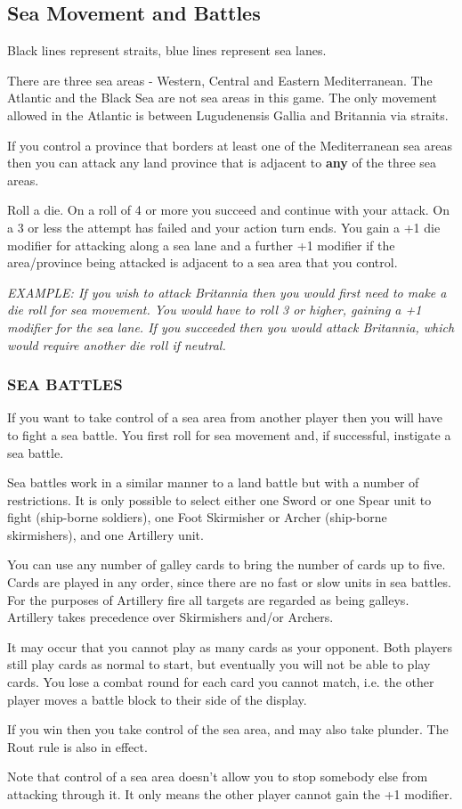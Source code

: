 \subsection{Sea Movement and Battles}

Black lines represent straits, blue lines represent sea lanes.

There are three sea areas - Western, Central and Eastern Mediterranean. The Atlantic and the Black Sea are not sea areas in this game. The only movement allowed in the Atlantic is between Lugudenensis Gallia and Britannia via straits.

If you control a province that borders at least one of the Mediterranean sea areas then you can attack any land province that is adjacent to \textbf{any} of the three sea areas.

Roll a die. On a roll of 4 or more you succeed and continue with your attack. On a 3 or less the attempt has failed and your action turn ends. You gain a +1 die modifier for attacking along a sea lane and a further +1 modifier if the area/province being attacked is adjacent to a sea area that you control.

\textit{EXAMPLE: If you wish to attack Britannia then you would first need to make a die roll for sea movement. You would have to roll 3 or higher, gaining a +1 modifier for the sea lane. If you succeeded then you would attack Britannia, which would require another die roll if neutral.}

\subsubsection{SEA BATTLES}

If you want to take control of a sea area from another player then you will have to fight a sea battle. You first roll for sea movement and, if successful, instigate a sea battle.

Sea battles work in a similar manner to a land battle but with a number of restrictions. It is only possible to select either one Sword or one Spear unit to fight (ship-borne soldiers), one Foot Skirmisher or Archer (ship-borne skirmishers), and one Artillery unit.

You can use any number of galley cards to bring the number of cards up to five. Cards are played in any order, since there are no fast or slow units in sea battles. For the purposes of Artillery fire all targets are regarded as being galleys. Artillery takes precedence over Skirmishers and/or Archers.

It may occur that you cannot play as many cards as your opponent. Both players still play cards as normal to start, but eventually you will not be able to play cards. You lose a combat round for each card you cannot match, i.e. the other player moves a battle block to their side of the display.

If you win then you take control of the sea area, and may also take plunder. The Rout rule is also in effect.

Note that control of a sea area doesn't allow you to stop somebody else from attacking through it. It only means the other player cannot gain the +1 modifier.
